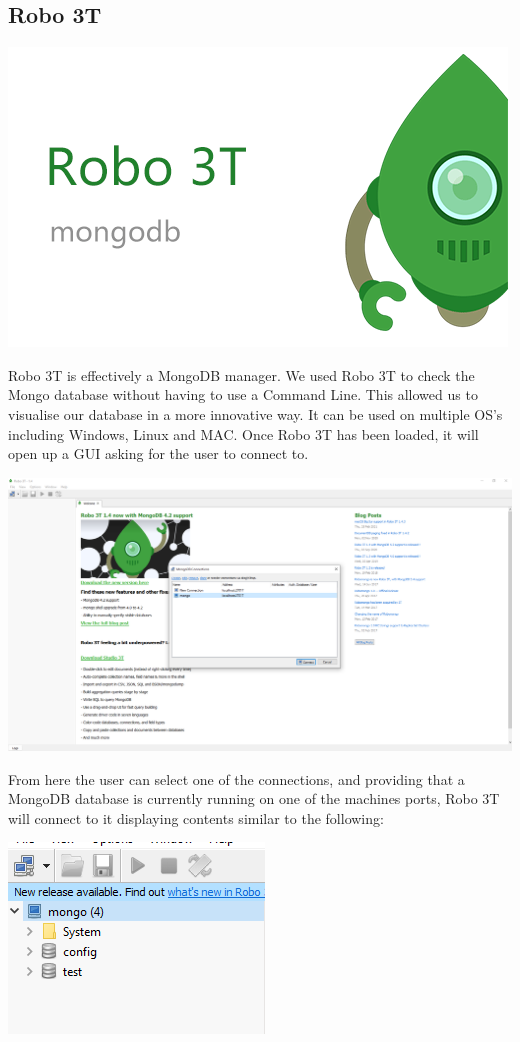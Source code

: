 \subsection{Robo 3T}
\includegraphics[scale=0.6]{img/robo-logo.png}\par
Robo 3T is effectively a MongoDB manager. We used Robo 3T to check the Mongo database without having to use a Command Line. This allowed us to visualise our database in a more innovative way. It can be used on multiple OS's including Windows, Linux and MAC. Once Robo 3T has been loaded, it will open up a GUI asking for the user to connect to. \par
\includegraphics[scale=0.3]{img/robo-connect.PNG}\par
From here the user can select one of the connections, and providing that a MongoDB database is currently running on one of the machines ports, Robo 3T will connect to it displaying contents similar to the following: \par
\includegraphics[]{img/robo-contents.PNG} \par
